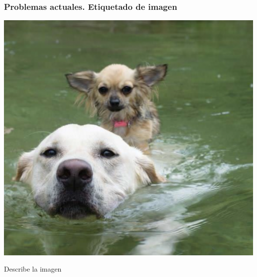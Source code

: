\documentclass[
10pt, %
aspectratio=169, %
]{beamer}
\begin{document}
	\begin{frame}
		
		\frametitle{Problemas actuales. Etiquetado de imagen}
		
		\centering
		\begin{minipage}{.65\textwidth}
			\includegraphics[scale=0.4]{perro-nadando.png} 
			
		\end{minipage}%
		\begin{minipage}{.55\textwidth}
			Describe la imagen
			
		\end{minipage}
		
		
	\end{frame}
	
	
\end{document}
